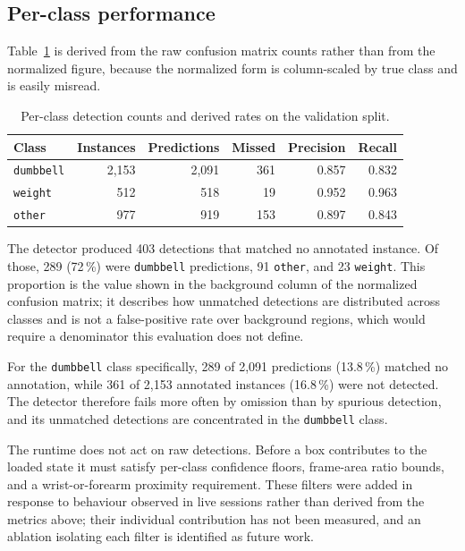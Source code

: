 \documentclass[11pt,a4paper]{article}
\newcommand{\code}[1]{\texttt{\small #1}}
\begin{document}
\subsection{Per-class performance}

Table~\ref{tab:perclass} is derived from the raw confusion matrix counts rather
than from the normalized figure, because the normalized form is column-scaled by
true class and is easily misread.

\begin{table}[H]
\centering
\small
\caption{Per-class detection counts and derived rates on the validation split.}
\label{tab:perclass}
\begin{tabular}{@{}lrrrrr@{}}
\toprule
\textbf{Class} & \textbf{Instances} & \textbf{Predictions} & \textbf{Missed} & \textbf{Precision} & \textbf{Recall} \\
\midrule
\code{dumbbell} & 2{,}153 & 2{,}091 & 361 & 0.857 & 0.832 \\
\code{weight}   &   512   &   518   &  19 & 0.952 & 0.963 \\
\code{other}    &   977   &   919   & 153 & 0.897 & 0.843 \\
\bottomrule
\end{tabular}
\end{table}

The detector produced 403 detections that matched no annotated instance. Of
those, 289 (72\,\%) were \code{dumbbell} predictions, 91 \code{other}, and 23
\code{weight}. This proportion is the value shown in the background column of the
normalized confusion matrix; it describes how unmatched detections are
distributed across classes and is not a false-positive rate over background
regions, which would require a denominator this evaluation does not define.

For the \code{dumbbell} class specifically, 289 of 2{,}091 predictions (13.8\,\%)
matched no annotation, while 361 of 2{,}153 annotated instances (16.8\,\%) were
not detected. The detector therefore fails more often by omission than by
spurious detection, and its unmatched detections are concentrated in the
\code{dumbbell} class.

The runtime does not act on raw detections. Before a box contributes to the
loaded state it must satisfy per-class confidence floors, frame-area ratio
bounds, and a wrist-or-forearm proximity requirement. These filters were added in
response to behaviour observed in live sessions rather than derived from the
metrics above; their individual contribution has not been measured, and an
ablation isolating each filter is identified as future work.
\end{document}
